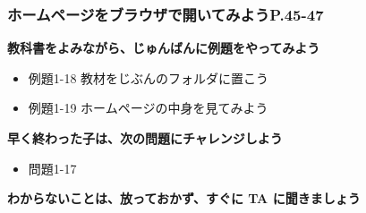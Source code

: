 \documentclass[dvipdfmx]{beamer}
\begin{document}
\begin{frame}[fragile]
	\frametitle{ホームページをブラウザで開いてみようP.45-47~~~}
      \large\textbf{教科書をよみながら、じゅんばんに例題をやってみよう}
				\begin{itemize}
					\item 例題1-18 教材をじぶんのフォルダに置こう
					\item 例題1-19 ホームページの中身を見てみよう
				\end{itemize}
      \vfill
      \large\textbf{早く終わった子は、次の問題にチャレンジしよう}
      \begin{itemize}
        \item 問題1-17
      \end{itemize}
      \vfill
      \large\textbf{わからないことは、放っておかず、すぐに TA に聞きましょう}
\end{frame}


\end{document}
